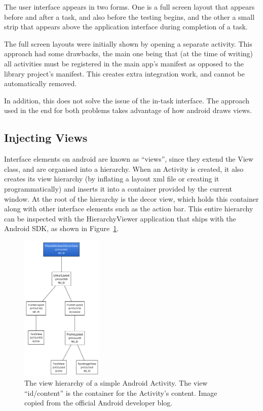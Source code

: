 The user interface appears in two forms. One is a full screen layout
that appears before and after a task, and also before the testing
begins, and the other a small strip that appears above the 
application interface during completion of a task.

The full screen layouts were initially shown by opening a separate
activity. This approach had some drawbacks, the main one being that
(at the time of writing) all activities must be registered in the
main app's manifest as opposed to the library project's manifest.
This creates extra integration work, and cannot be automatically
removed.

In addition, this does not solve the issue of the in-task interface.
The approach used in the end for both problems takes advantage of
how android draws views.

\subsection{Injecting Views}

Interface elements on android are known as ``views'', since they
extend the View class, and are organised into a hierarchy.
When an Activity is created, it also creates its view hierarchy
(by inflating a layout xml file or creating it programmatically)
and inserts it into a container provided by the current window.
At the root of the hierarchy is the decor view, which holds this
container along with other interface elements such as the action
bar. This entire hierarchy can be inspected with the HierarchyViewer
application that ships with the Android SDK, as shown in 
Figure~\ref{fig:view-hierarchy}.

\begin{figure}[h]
  \centering
  \includegraphics[width=0.35\textwidth]{images/view-hierarchy}
  \caption{The view hierarchy of a simple Android Activity. The
           view ``id/content'' is the container for the Activity's
           content. Image copied from the official Android 
           developer blog.}
  \label{fig:view-hierarchy}
\end{figure}

